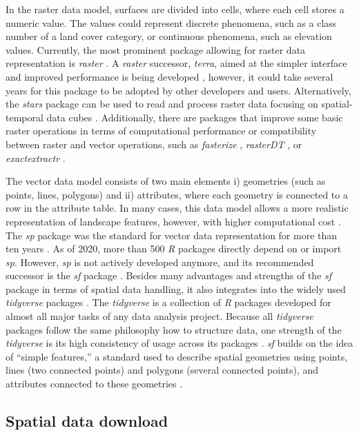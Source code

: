 \documentclass[smallextended]{svjour3}       %
\begin{document}
In the raster data model, surfaces are divided into cells, where each cell stores a numeric value.
The values could represent discrete phenomena, such as a class number of a land cover category, or continuous phenomena, such as elevation values.
Currently, the most prominent package allowing for raster data representation is \textit{raster} \cite{Hijmans2019}.
A \textit{raster} successor, \textit{terra}, aimed at the simpler interface and improved performance is being developed \cite{Hijmans2021}, however, it could take several years for this package to be adopted by other developers and users.
Alternatively, the \textit{stars} package can be used to read and process raster data focusing on spatial-temporal data cubes \cite{Pebesma2019}.
Additionally, there are packages that improve some basic raster operations in terms of computational performance or compatibility between raster and vector operations, such as \textit{fasterize} \cite{Ross2020}, \textit{rasterDT} \cite{OBrien2020}, or \textit{exactextractr} \cite{Baston2020}.

The vector data model consists of two main elements i) geometries (such as points, lines, polygons) and ii) attributes, where each geometry is connected to a row in the attribute table.
In many cases, this data model allows a more realistic representation of landscape features, however, with higher computational cost \cite{Lovelace2019}.
The \textit{sp} package was the standard for vector data representation for more than ten years \cite{Pebesma2005,Bivand2013}.
As of 2020, more than 500 \textit{R} packages directly depend on or import \textit{sp}.
However, \textit{sp} is not actively developed anymore, and its recommended successor is the \textit{sf} package \cite{Pebesma2018}.
Besides many advantages and strengths of the \textit{sf} package in terms of spatial data handling, it also integrates into the widely used \textit{tidyverse} packages \cite{Wickham2019}.
The \textit{tidyverse} is a collection of \textit{R} packages developed for almost all major tasks of any data analysis project.
Because all \textit{tidyverse} packages follow the same philosophy how to structure data, one strength of the \textit{tidyverse} is its high consistency of usage across its packages \cite{Wickham2019}.
\textit{sf} builds on the idea of ``simple features,'' a standard used to describe spatial geometries using points, lines (two connected points) and polygons (several connected points), and attributes connected to these geometries \cite{Pebesma2019a}.

\hypertarget{spatial-data-download}{%
\subsection{Spatial data download}\label{spatial-data-download}}
\end{document}
